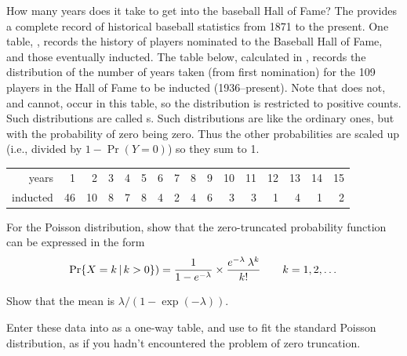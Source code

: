\documentclass[11pt]{report}\usepackage[]{graphicx}\usepackage[]{color}
\begin{document}
\begin{Exercises}
\exercise\exhard How many years does it take to get into the baseball Hall of Fame?
  The  provides a complete record of historical baseball statistics from 1871 to
  the present.  One table, , records the history of players nominated to
  the Baseball Hall of Fame, and those eventually inducted.  The table below, calculated
  in , records the distribution of the number of years
  taken (from first nomination)
  for the 109 players in the Hall of Fame to be inducted (1936--present).
  Note that  does not, and cannot, occur in this table, so the distribution
  is restricted to positive counts.  Such distributions are called s.
  Such distributions are like the ordinary ones, but with the probability of zero being zero.
  Thus the other probabilities are scaled up (i.e., divided by $1-\Pr(Y=0)$) so they sum to 1.

\begin{tabular}{r|rrrrrrrrrrrrrrr}
  \hline
years    & 1 & 2 & 3 & 4 & 5 & 6 & 7 & 8 & 9 & 10 & 11 & 12 & 13 & 14 & 15 \\
inducted &  46 &  10 &   8 &   7 &   8 &   4 &   2 &   4 &   6 &   3 &   3 &   1 &   4 &   1 &   2 \\
   \hline
\end{tabular}

    \begin{enumerate*}
      \item For the Poisson distribution, show that the zero-truncated probability function can be expressed in the
      form
			\begin{equation*}
			\Pr \{ X = k \, | \, k>0\} )=
			  \frac{1}{1-e^{-\lambda}} \times
			  \frac{ e^{ - \lambda } \:  \lambda^k } { k ! }
			  \quad\quad k = 1, 2, \dots
			\end{equation*}
			\begin{ans}
			\end{ans}
			

      \item Show that the mean is $\lambda/(1-\exp(-\lambda))$.
      \begin{ans}
      \end{ans}
      
      \item Enter these data into \R as a one-way table, and use  to fit the standard
      Poisson distribution, as if you hadn't encountered the problem of zero truncation.
      \begin{ans}
      \end{ans}
      

    \end{enumerate*}


\end{Exercises}
\end{document}
